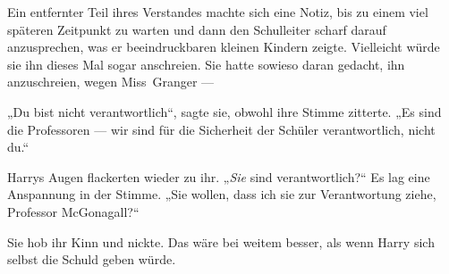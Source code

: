 Ein entfernter Teil ihres Verstandes machte sich eine Notiz, bis zu einem viel späteren Zeitpunkt zu warten und dann den Schulleiter scharf darauf anzusprechen, was er beeindruckbaren kleinen Kindern zeigte. Vielleicht würde sie ihn dieses Mal sogar anschreien. Sie hatte sowieso daran gedacht, ihn anzuschreien, wegen Miss~Granger —

„Du bist nicht verantwortlich“, sagte sie, obwohl ihre Stimme zitterte.
„Es sind die Professoren — wir sind für die Sicherheit der Schüler verantwortlich, nicht du.“

Harrys Augen flackerten wieder zu ihr.
„\emph{Sie} sind verantwortlich?“ Es lag eine Anspannung in der Stimme.
„Sie wollen, dass ich sie zur Verantwortung ziehe, Professor McGonagall?“

Sie hob ihr Kinn und nickte. Das wäre bei weitem besser, als wenn Harry sich selbst die Schuld geben würde.

